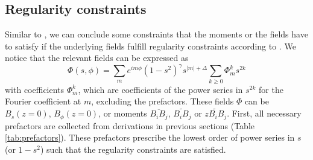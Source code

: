 \documentclass[a4paper, 11pt]{article}
\begin{document}
\subsection{Regularity constraints}

Similar to \textcite{holdenried-chernoff_long_2021}, we can conclude some constraints that the moments or the fields have to satisfy if the underlying fields fulfill regularity constraints according to \textcite{lewis_physical_1990}. We notice that the relevant fields can be expressed as
\[
\Phi(s, \phi) = \sum_m e^{im\phi} \left(1-s^2\right)^\gamma s^{|m|+\Delta} \sum_{k\geq 0} \Phi_m^k s^{2k}
\]
with coefficients $\Phi_m^k$, which are coefficients of the power series in $s^{2k}$ for the Fourier coefficient at $m$, excluding the prefactors. These fields $\Phi$ can be $B_s(z = 0)$, $B_\phi(z=0)$, or moments $\overline{B_i B_j}$, $\widetilde{B_i B_j}$ or $\widetilde{z B_i B_j}$. First, all necessary prefactors are collected from derivations in previous sections (Table \ref{tab:prefactors}). These prefactors prescribe the lowest order of power series in $s$ (or $1-s^2$) such that the regularity constraints are satisfied.
\end{document}
